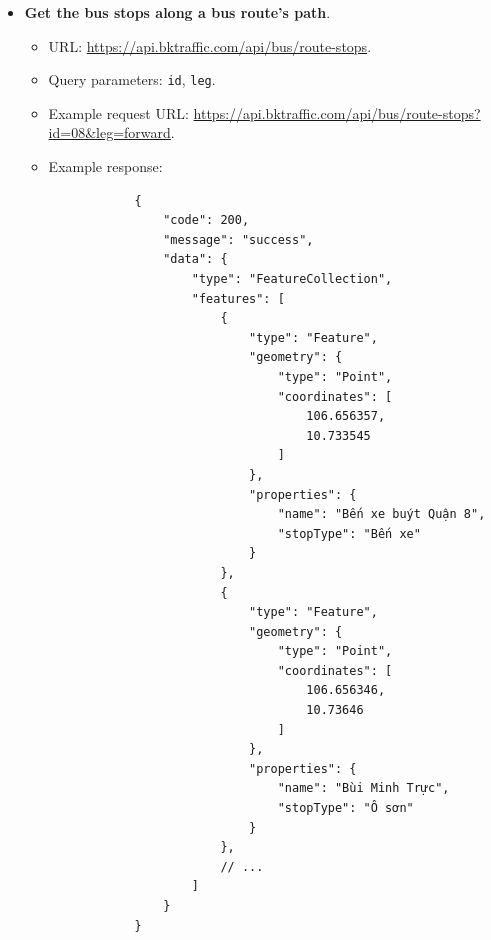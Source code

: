 \begin{itemize}
    \item \textbf{Get the bus stops along a bus route's path}.
    \begin{itemize}
        \item URL: \url{https://api.bktraffic.com/api/bus/route-stops}.
        \item Query parameters: \lstinline{id}, \lstinline{leg}.
        \item Example request URL: \url{https://api.bktraffic.com/api/bus/route-stops?id=08&leg=forward}.
        \item Example response:
        \begin{lstlisting}
            {
                "code": 200,
                "message": "success",
                "data": {
                    "type": "FeatureCollection",
                    "features": [
                        {
                            "type": "Feature",
                            "geometry": {
                                "type": "Point",
                                "coordinates": [
                                    106.656357,
                                    10.733545
                                ]
                            },
                            "properties": {
                                "name": "Bến xe buýt Quận 8",
                                "stopType": "Bến xe"
                            }
                        },
                        {
                            "type": "Feature",
                            "geometry": {
                                "type": "Point",
                                "coordinates": [
                                    106.656346,
                                    10.73646
                                ]
                            },
                            "properties": {
                                "name": "Bùi Minh Trực",
                                "stopType": "Ô sơn"
                            }
                        },
                        // ... 
                    ]
                }
            }
        \end{lstlisting}
    \end{itemize}


\end{itemize}
